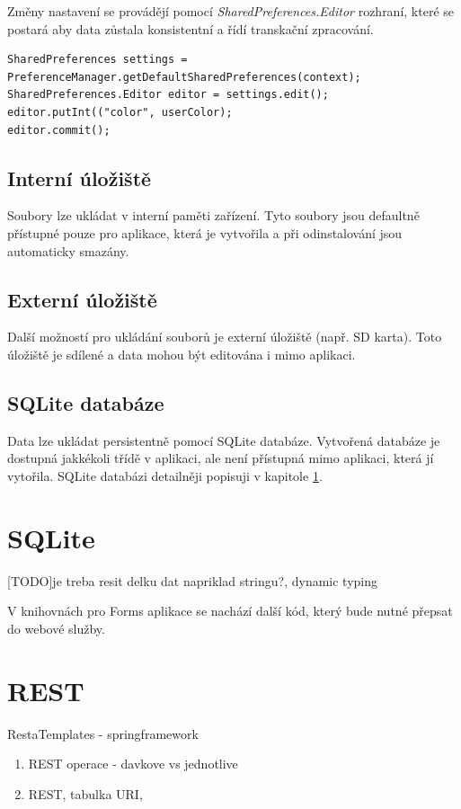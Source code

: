 \documentclass{diplomka}
\begin{document}
\noindent
Změny nastavení se provádějí pomocí \emph{SharedPreferences.Editor} rozhraní, které se postará aby data zůstala konsistentní a řídí transkační zpracování.\\
\begin{lstlisting}
SharedPreferences settings = PreferenceManager.getDefaultSharedPreferences(context);
SharedPreferences.Editor editor = settings.edit();
editor.putInt(("color", userColor);
editor.commit();
\end{lstlisting}

\subsection*{Interní úložiště}
Soubory lze ukládat v interní paměti zařízení. Tyto soubory jsou defaultně přístupné pouze pro aplikace, která je vytvořila a při odinstalování jsou automaticky smazány.
\subsection*{Externí úložiště}
Další možností pro ukládání souborů je externí úložiště (např. SD karta).  Toto úložiště je sdílené a data mohou být editována i mimo aplikaci.
\subsection*{SQLite databáze}
Data lze ukládat persistentně pomocí SQLite databáze. Vytvořená databáze je dostupná jakkékoli třídě v aplikaci, ale není přístupná mimo aplikaci, která jí vytořila. SQLite databázi detailněji popisuji v kapitole \ref{sqlite}.

\section{SQLite}
\label{sqlite}
[TODO]je treba resit delku dat napriklad stringu?, dynamic typing

V knihovnách pro Forms aplikace se nachází další kód, který bude nutné přepsat do webové služby.

\section{REST}
RestaTemplates - springframework
\begin{enumerate}
\item REST operace - davkove vs jednotlive
\item REST, tabulka URI, 
\end{enumerate}
\end{document}
